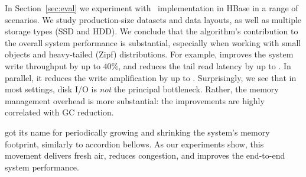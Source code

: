 In Section~\ref{sec:eval} we experiment with \sys\ implementation in HBase in a range of scenarios.
We study production-size datasets and data layouts, as well as multiple storage types (SSD and HDD). 
We conclude that the algorithm's contribution to the overall system performance is substantial, 
especially when working with small objects and heavy-tailed (Zipf) distributions. For example, \sys\/ 
improves the system write throughput by up to $40\%$, and reduces the tail read latency by up to 
. In parallel, it reduces the write amplification by up to . Surprisingly, we see 
that in most settings, disk I/O is \emph{not} the principal bottleneck. Rather, the memory management 
overhead is more substantial: the improvements are highly correlated with GC reduction. 

\sys\/ got its name for periodically growing and shrinking the system's memory footprint, similarly 
to accordion bellows. As our experiments show, this movement delivers fresh air, reduces congestion, 
and improves the end-to-end system performance. 


